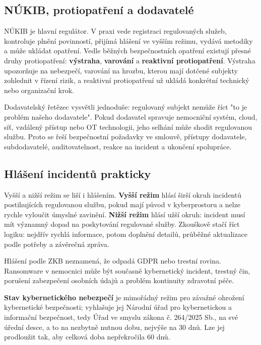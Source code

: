 \subsection*{NÚKIB, protiopatření a dodavatelé}
NÚKIB je hlavní regulátor. V praxi vede registraci regulovaných služeb, kontroluje plnění povinností, přijímá hlášení ve vyšším režimu, vydává metodiky a může ukládat opatření. Vedle běžných bezpečnostních opatření existují přesné druhy protiopatření: \textbf{výstraha}, \textbf{varování} a \textbf{reaktivní protiopatření}. Výstraha upozorňuje na nebezpečí, varování na hrozbu, kterou mají dotčené subjekty zohlednit v řízení rizik, a reaktivní protiopatření už ukládá konkrétní technický nebo organizační krok.

Dodavatelský řetězec vysvětli jednoduše: regulovaný subjekt nemůže říct "to je problém našeho dodavatele". Pokud dodavatel spravuje nemocniční systém, cloud, síť, vzdálený přístup nebo OT technologii, jeho selhání může shodit regulovanou službu. Proto se řeší bezpečnostní požadavky ve smlouvě, přístupy dodavatele, subdodavatelé, auditovatelnost, reakce na incident a ukončení spolupráce.

\subsection*{Hlášení incidentů prakticky}
Vyšší a nižší režim se liší i hlášením. \textbf{Vyšší režim} hlásí širší okruh incidentů postihujících regulovanou službu, pokud mají původ v kyberprostoru a nelze rychle vyloučit úmyslné zavinění. \textbf{Nižší režim} hlásí užší okruh: incident musí mít významný dopad na poskytování regulované služby. Zkouškově stačí říct logiku: nejdřív rychlá informace, potom doplnění detailů, průběžné aktualizace podle potřeby a závěrečná zpráva.

Hlášení podle ZKB neznamená, že odpadá GDPR nebo trestní rovina. Ransomware v nemocnici může být současně kybernetický incident, trestný čin, porušení zabezpečení osobních údajů a problém kontinuity zdravotní péče.

\textbf{Stav kybernetického nebezpečí} je mimořádný režim pro závažné ohrožení kybernetické bezpečnosti; vyhlašuje jej Národní úřad pro kybernetickou a informační bezpečnost, tedy Úřad ve smyslu zákona č. 264/2025 Sb., na své úřední desce, a to na nezbytně nutnou dobu, nejvýše na 30 dnů. Lze jej prodloužit tak, aby celková doba nepřekročila 60 dnů.



